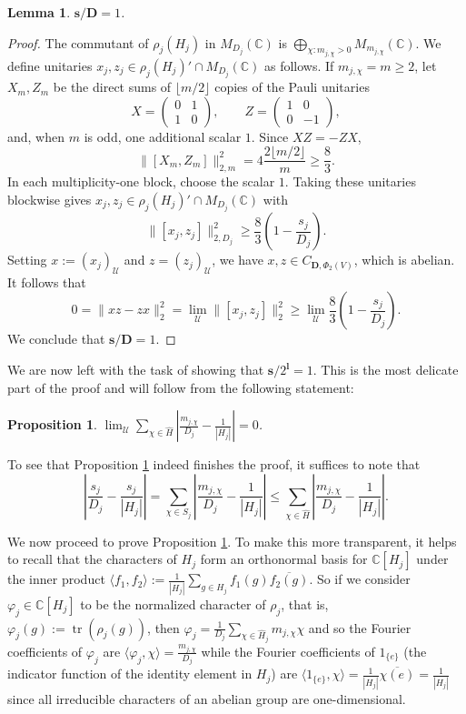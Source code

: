 \documentclass[12pt]{amsart}
\numberwithin{equation}{section}
\newtheorem{lem}[thm]{Lemma}
\newtheorem{prop}[thm]{Proposition}
\theoremstyle{definition}
\newcommand{\C}{\mathbb{C}}
\def\bb{\mathbb}
\def\cal{\mathcal}
\DeclareMathOperator{\tr}{tr}
\newcommand\cU{{\cal U}}
\def \u{\mathcal U}
\begin{document}
\begin{lem}
$\mathbf{s}/\mathbf{D}=1$.
\end{lem}

\begin{proof}
The commutant of $\rho_j(H_j)$ in $M_{D_j}(\C)$ is
$\bigoplus_{\chi:m_{j,\chi}>0}M_{m_{j,\chi}}(\C)$.  We define unitaries $x_j,z_j\in \rho_j(H_j)'\cap M_{D_j}(\C)$ as follows.  If $m_{j,\chi}=m\geq2$, let $X_m,Z_m$
be the direct sums of $\lfloor m/2\rfloor$ copies of the Pauli
unitaries
\[
 X=\begin{pmatrix}0&1\\1&0\end{pmatrix},
 \qquad
 Z=\begin{pmatrix}1&0\\0&-1\end{pmatrix},
\]
and, when $m$ is odd, one additional scalar $1$.  Since $XZ=-ZX$,
\[
 \|[X_m,Z_m]\|_{2,m}^2
 =4\frac{2\lfloor m/2\rfloor}{m}\geq\frac83.
\]
In each multiplicity-one block, choose the scalar $1$.  Taking these
unitaries blockwise gives $x_j,z_j\in\rho_j(H_j)'\cap M_{D_j}(\C)$ with
\[
 \|[x_j,z_j]\|_{2,D_j}^2\geq\frac83 (1-\frac{s_j}{D_j}).
\]
Setting $x:=(x_j)_\cU$ and $z=(z_j)_\cU$, we have $x,z\in C_{{\mathbf{D}},\Phi_2(V)}$, which is abelian.  It follows that
$$0=\|xz-zx\|_2^2=\lim_\cU \|[x_j,z_j]\|_2^2\geq \lim_\u\frac{8}{3}(1-\frac{s_j}{D_j}).$$  We conclude that $\mathbf{s}/\mathbf{D}=1$.
\end{proof}

We are now left with the task of showing that $\mathbf{s}/2^{\mathbf{l}}=1$.  This is the most delicate part of the proof and will follow from the following statement:

\begin{prop}\label{prop:nearidentity}
$\lim_\cU \sum_{\chi \in \hat {H}}|\frac{m_{j,\chi}}{D_j}-\frac{1}{|H_j|}|=0$. 
\end{prop}

To see that Proposition \ref{prop:nearidentity} indeed finishes the proof, it suffices to note that 
$$\left|\frac{s_j}{D_j}-\frac{s_j}{|H_j|}\right|=\sum_{\chi\in S_j}\left|\frac{m_{j,\chi}}{D_j}-\frac{1}{|H_j|}\right|\leq \sum_{\chi \in \hat {H}}\left|\frac{m_{j,\chi}}{D_j}-\frac{1}{|H_j|}\right|.$$

We now proceed to prove Proposition \ref{prop:nearidentity}.  To make this more transparent, it helps to recall that the characters of $H_j$ form an orthonormal basis for $\bb C[H_j]$ under the inner product $\langle f_1,f_2\rangle:=\frac{1}{|H_j|}\sum_{g\in H_j}f_1(g)\overline{f_2(g)}$.  So if we consider $\varphi_j\in \bb C[H_j]$ to be the normalized character of $\rho_j$, that is, $\varphi_j(g):=\tr(\rho_j(g))$, then $\varphi_j=\frac{1}{D_j}\sum_{\chi\in \hat{H}_j} m_{j,\chi}\chi$ and so the Fourier coefficients of $\varphi_j$ are $\langle \varphi_j,\chi\rangle=\frac{m_{j,\chi}}{D_j}$ while the Fourier coefficients of $1_{\{e\}}$ (the indicator function of the identity element in $H_j$) are $\langle 1_{\{e\}},\chi\rangle=\frac{1}{|H_j|}\overline{\chi(e)}=\frac{1}{|H_j|}$ since all irreducible characters of an abelian group are one-dimensional.  
\end{document}
